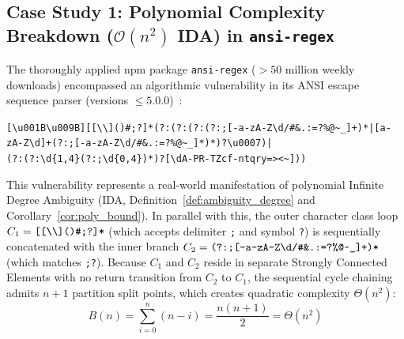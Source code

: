 \documentclass{ieeeaccess}
\begin{document}
\subsection{Case Study 1: Polynomial Complexity Breakdown ($\mathcal{O}(n^2)$ IDA) in \texttt{ansi-regex}}
The thoroughly applied npm package \texttt{ansi-regex} ($>50$ million weekly downloads) encompassed an algorithmic vulnerability in its ANSI escape sequence parser (versions $\le 5.0.0$)~\cite{cve_2021_3807}:
\begin{center}\vspace{-4pt}
\scriptsize\texttt{[\textbackslash u\hspace{1.8pt}001\hspace{1.8pt}B\textbackslash u009B][[\textbackslash\textbackslash]()\allowbreak{}\#;?]*(?:(?:(?:(?:;[-a-zA-Z\textbackslash d/\#\&.:=?\%@\textasciitilde\_]+)\allowbreak{}*|\allowbreak{}[a-zA-Z\textbackslash d]+(?:;[-a-zA-Z\textbackslash d/\#\&.:=?\%@\textasciitilde\_]*)\allowbreak{}*)\allowbreak{}?\textbackslash u0007)\allowbreak{}|\allowbreak{}}\\
\scriptsize\texttt{(?:(?:\textbackslash d\{1,4\}(?:;\textbackslash d\{0,4\})\allowbreak{}*)\allowbreak{}?[\textbackslash dA-PR-TZcf-ntqry=\textgreater\textless\textasciitilde])\allowbreak{})\allowbreak{}}
\vspace{-4pt}\end{center}
This vulnerability represents a real-world manifestation of polynomial Infinite Degree Ambiguity (IDA, Definition~\ref{def:ambiguity_degree} and Corollary~\ref{cor:poly_bound}). In parallel with this, the outer character class loop $C_1 = \text{\texttt{[[\textbackslash\textbackslash]()\#;?]*}}$ (which accepts delimiter \texttt{;} and symbol \texttt{?}) is sequentially concatenated with the inner branch $C_2 = \text{\texttt{(?:;[-a-zA-Z\textbackslash d/\#\&.:=?\%@\textasciitilde\_]+)*}}$ (which matches \texttt{;?}). Because $C_1$ and $C_2$ reside in separate Strongly Connected Elements with no return transition from $C_2$ to $C_1$, the sequential cycle chaining admits $n+1$ partition split points, which creates quadratic complexity $\Theta(n^2)$:
\begin{equation}\label{eq:ansi_backtrack_sum}
B(n) = \sum_{i=0}^n (n-i) = \frac{n(n+1)}{2} = \Theta(n^2)
\end{equation}
\end{document}
